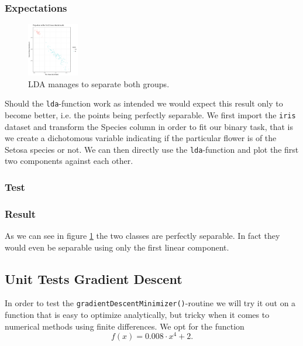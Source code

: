 \documentclass{article}
\begin{document}
\subsubsection{Expectations}

\begin{figure}
\label{irisLDA}
\includegraphics[scale=0.8, width=0.2\textwidth, trim={10mm 20mm 30mm 30mm}]{../LDA/irisLDA.png}
\vspace{2mm}
\caption{LDA manages to separate both groups.}
\end{figure}

Should the \texttt{lda}-function work as intended we would expect this result only to become better, i.e. the points being perfectly separable. We first import the \texttt{iris} dataset and transform the Species column in order to fit our binary task, that is we create a dichotomous variable indicating if the particular flower is of the Setosa species or not. We can then directly use the \texttt{lda}-function and plot the first two components against each other.

\vspace{5mm}
\subsubsection{Test}



\subsubsection{Result}
As we can see in figure \ref{irisLDA} the two classes are perfectly separable. In fact they would even be separable using only the first linear component.


\subsection{Unit Tests Gradient Descent}

In order to test the \texttt{gradientDescentMinimizer()}-routine we will try it out on a function that is easy to optimize analytically, but tricky when it comes to numerical methods using finite differences. We opt for the function $$f(x)=0.008\cdot x^4 +2.$$
\end{document}
